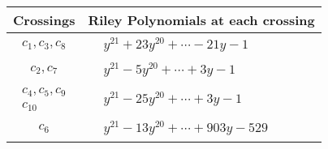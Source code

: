 \documentclass[1p]{elsarticle_modified}
\theoremstyle{definition}
\begin{document}
\begin{tabular}{m{50pt}|m{274pt}}
Crossings & \hspace{64pt}Riley Polynomials at each crossing \\
\hline $$\begin{aligned}c_{1},c_{3},c_{8}\end{aligned}$$&$\begin{aligned}
&y^{21}+23 y^{20}+\cdots-21 y-1
\end{aligned}$\\
\hline $$\begin{aligned}c_{2},c_{7}\end{aligned}$$&$\begin{aligned}
&y^{21}-5 y^{20}+\cdots+3 y-1
\end{aligned}$\\
\hline $$\begin{aligned}c_{4},c_{5},c_{9}\\c_{10}\end{aligned}$$&$\begin{aligned}
&y^{21}-25 y^{20}+\cdots+3 y-1
\end{aligned}$\\
\hline $$\begin{aligned}c_{6}\end{aligned}$$&$\begin{aligned}
&y^{21}-13 y^{20}+\cdots+903 y-529
\end{aligned}$\\
\hline
\end{tabular}
\vskip 2pc
\end{document}

